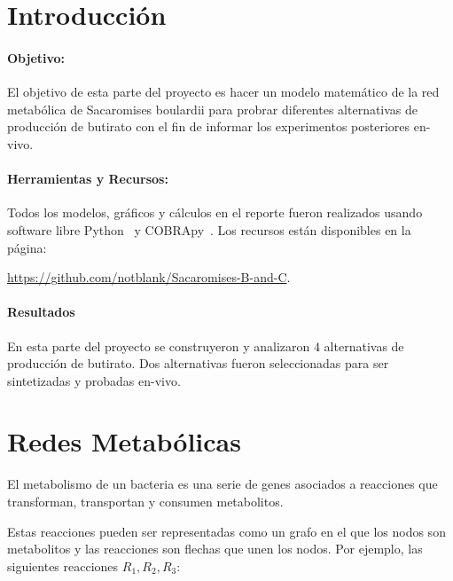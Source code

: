 \documentclass[12pt,spanish]{article}
\begin{document}
\maketitle


\section{Introducción}

\paragraph{Objetivo:} El objetivo de esta parte del proyecto es hacer un modelo matemático de la red metabólica de Sacaromises boulardii para probrar diferentes alternativas de producción de butirato con el fin de informar los experimentos posteriores en-vivo.

\paragraph{Herramientas y Recursos:} Todos los modelos, gráficos y cálculos en el reporte fueron realizados usando software libre Python~\cite{python} y COBRApy~\cite{COBRApy}. Los recursos están disponibles en la página:

\begin{center}
  \href{https://github.com/notblank/Sacaromises-B-and-C}{https://github.com/notblank/Sacaromises-B-and-C}.
\end{center}

\paragraph{Resultados}
En esta parte del proyecto se construyeron y analizaron $4$ alternativas de producción de butirato. Dos alternativas fueron seleccionadas para ser sintetizadas y probadas en-vivo.

\section{Redes Metabólicas}
El metabolismo de un bacteria es una serie de genes asociados a reacciones que transforman, transportan y consumen metabolitos.

\par
Estas reacciones pueden ser representadas como un grafo en el que los nodos son metabolitos y las reacciones son flechas que unen los nodos. Por ejemplo, las siguientes reacciones $R_1, R_2, R_3$:
\end{document}
